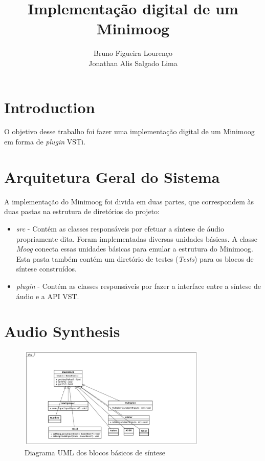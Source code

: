 \documentclass{article}
\title{Implementação digital de um Minimoog}
\author{Bruno Figueira Lourenço \\ Jonathan Alis Salgado Lima}
\begin{document}
\maketitle

\section{Introduction}
\label{sec:Introduction}

O objetivo desse trabalho foi fazer uma implementação digital de um Minimoog em forma de \emph{plugin} VSTi.

\section{Arquitetura Geral do Sistema}


A implementação do Minimoog foi divida em duas partes, que correspondem às 
duas pastas na estrutura de diretórios do projeto:

\begin{itemize}
	\item \emph{src} - Contém as classes responsáveis por efetuar 
	a síntese de áudio propriamente dita. Foram implementadas diversas 
	unidades básicas. A classe \emph{Moog} conecta essas unidades básicas para 
	emular a estrutura do Minimoog. Esta pasta também contém um diretório 
	de testes (\emph{Tests}) para os blocos de síntese construídos.
	\item \emph{plugin} - Contém as classes responsáveis por fazer a 
	interface entre a síntese de áudio e a API VST.
\end{itemize}

\section{Audio Synthesis}



\begin{figure}
\centering
\includegraphics[width=0.8\textwidth,natwidth=610,natheight=642]{Classes.jpg}\caption{Diagrama UML dos blocos básicos de síntese}\label{fig:uml1}
\end{figure}
\end{document}
